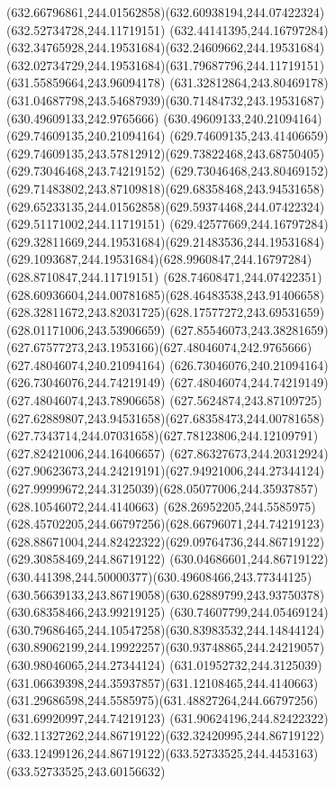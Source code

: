 {{	\curveto(632.66796861,244.01562858)(632.60938194,244.07422324)(632.52734728,244.11719151)
	\curveto(632.44141395,244.16797284)(632.34765928,244.19531684)(632.24609662,244.19531684)
	\curveto(632.02734729,244.19531684)(631.79687796,244.11719151)(631.55859664,243.96094178)
	\curveto(631.32812864,243.80469178)(631.04687798,243.54687939)(630.71484732,243.19531687)
	\lineto(630.49609133,242.9765666)
	\lineto(630.49609133,240.21094164)
	\lineto(629.74609135,240.21094164)
	\lineto(629.74609135,243.41406659)
	\curveto(629.74609135,243.57812912)(629.73822468,243.68750405)(629.73046468,243.74219152)
	\curveto(629.73046468,243.80469152)(629.71483802,243.87109818)(629.68358468,243.94531658)
	\curveto(629.65233135,244.01562858)(629.59374468,244.07422324)(629.51171002,244.11719151)
	\curveto(629.42577669,244.16797284)(629.32811669,244.19531684)(629.21483536,244.19531684)
	\curveto(629.1093687,244.19531684)(628.9960847,244.16797284)(628.8710847,244.11719151)
	\curveto(628.74608471,244.07422351)(628.60936604,244.00781685)(628.46483538,243.91406658)
	\curveto(628.32811672,243.82031725)(628.17577272,243.69531659)(628.01171006,243.53906659)
	\curveto(627.85546073,243.38281659)(627.67577273,243.1953166)(627.48046074,242.9765666)
	\lineto(627.48046074,240.21094164)
	\lineto(626.73046076,240.21094164)
	\lineto(626.73046076,244.74219149)
	\lineto(627.48046074,244.74219149)
	\lineto(627.48046074,243.78906658)
	\curveto(627.5624874,243.87109725)(627.62889807,243.94531658)(627.68358473,244.00781658)
	\curveto(627.7343714,244.07031658)(627.78123806,244.12109791)(627.82421006,244.16406657)
	\curveto(627.86327673,244.20312924)(627.90623673,244.24219191)(627.94921006,244.27344124)
	\curveto(627.99999672,244.3125039)(628.05077006,244.35937857)(628.10546072,244.4140663)
	\curveto(628.26952205,244.5585975)(628.45702205,244.66797256)(628.66796071,244.74219123)
	\curveto(628.88671004,244.82422322)(629.09764736,244.86719122)(629.30858469,244.86719122)
	\curveto(630.04686601,244.86719122)(630.441398,244.50000377)(630.49608466,243.77344125)
	\curveto(630.56639133,243.86719058)(630.62889799,243.93750378)(630.68358466,243.99219125)
	\curveto(630.74607799,244.05469124)(630.79686465,244.10547258)(630.83983532,244.14844124)
	\curveto(630.89062199,244.19922257)(630.93748865,244.24219057)(630.98046065,244.27344124)
	\curveto(631.01952732,244.3125039)(631.06639398,244.35937857)(631.12108465,244.4140663)
	\curveto(631.29686598,244.5585975)(631.48827264,244.66797256)(631.69920997,244.74219123)
	\curveto(631.90624196,244.82422322)(632.11327262,244.86719122)(632.32420995,244.86719122)
	\curveto(633.12499126,244.86719122)(633.52733525,244.4453163)(633.52733525,243.60156632)
}}
